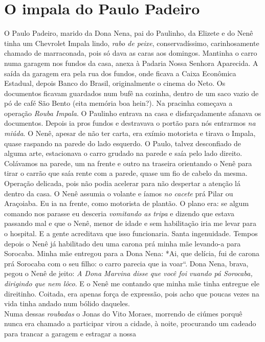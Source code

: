 \documentclass[12pt,brazil,]{book}
\begin{document}
\section{O impala do Paulo Padeiro}\label{o-impala-do-paulo-padeiro}

O Paulo Padeiro, marido da Dona Nena, pai do Paulinho, da Elizete e do
Nenê tinha um Chevrolet Impala lindo, \emph{rabo de peixe},
conservadíssimo, carinhosamente chamado de marraconada, pois só dava as
caras aos domingos. Mantinha o carro numa garagem nos fundos da casa,
anexa à Padaria Nossa Senhora Aparecida. A saída da garagem era pela rua
dos fundos, onde ficava a Caixa Econômica Estadual, depois Banco do
Brasil, originalmente o cinema do Neto. Os documentos ficavam guardados
num bufê na cozinha, dentro de um saco vazio de pó de café São Bento
(eita memória boa hein?). Na pracinha começava a operação \emph{Rouba
Impala}. O Paulinho entrava na casa e disfarçadamente afanava os
documentos. Depois ia pros fundos e destravava o portão para nós
entrarmos \emph{na miúda}. O Nenê, apesar de não ter carta, era exímio
motorista e tirava o Impala, quase raspando na parede do lado esquerdo.
O Paulo, talvez desconfiado de alguma arte, estacionava o carro grudado
na parede e saía pelo lado direito. Colávamos na parede, um na frente e
outro na traseira orientando o Nenê para tirar o carrão que saía rente
com a parede, quase um fio de cabelo da mesma. Operação delicada, pois
não podia acelerar para não despertar a atenção lá dentro da casa. O
Nenê assumia o volante e íamos \emph{no cacete} prá Pilar ou Araçoiaba.
Eu ia na frente, como motorista de plantão. O plano era: se algum
comando nos parasse eu desceria \emph{vomitando as tripa} e dizendo que
estava passando mal e que o Nenê, menor de idade e sem habilitação iria
me levar para o hospital. E a gente acreditava que isso funcionaria.
Santa ingenuidade. Tempos depois o Nenê já habilitado deu uma carona prá
minha mãe levando-a para Sorocaba. Minha mãe entregou para a Dona Nena:
*Ai, que delícia, fui de carona prá Sorocaba com o seu filho: o carro
parecia que ia voar``. Dona Nena, brava, pegou o Nenê de jeito: \emph{A
Dona Marvina disse que você foi vuando pá Sorocaba, dirigindo que nem
lôco}. E o Nenê me contando que minha mãe tinha entregue ele direitinho.
Coitada, era apenas força de expressão, pois acho que poucas vezes na
vida tinha andado num bólido daqueles.\\
Numa dessas \emph{roubadas} o Jonas do Vito Moraes, morrendo de ciúmes
porquê nunca era chamado a participar virou a cidade, à noite,
procurando um cadeado para trancar a garagem e estragar a nossa
\end{document}
